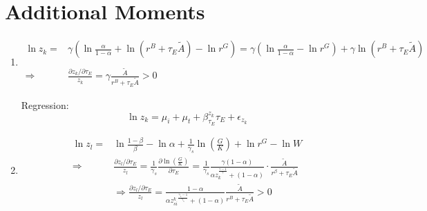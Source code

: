 \documentclass[12pt]{article} %
\begin{document}
\section*{Additional Moments}
\begin{enumerate}
    \item 
    \begin{equation*}
        \begin{split}
            \ln z_k =& {\gamma} (
            \ln \frac{\alpha}{1-\alpha} + \ln ({r^B + \tau_E\tilde{A}}) - \ln {r^G} ) =  {\gamma} (\ln \frac{\alpha}{1-\alpha} - \ln {r^G}) + {\gamma} \ln ({r^B + \tau_E\tilde{A}})\\
            \\
            \Rightarrow & \frac{\partial z_k/\partial \tau_E }{z_k} = {\gamma} \frac{\tilde{A}}{r^B + \tau_E\tilde{A}}>0
        \end{split}
    \end{equation*}

    Regression:
    \begin{equation*}
        \ln z_k = \mu_i + \mu_t + \beta_{\tau_E}^{z_k} \tau_E + \epsilon_{z_k}
    \end{equation*}



    \item 
    \begin{equation*}
        \begin{split}
            \ln z_l =& \ln \frac{1-\beta}{\beta} - \ln {\alpha} +\frac{1}{\gamma_s} \ln (\frac{G}{K}) + \ln r^G - \ln W\\
            \Rightarrow & \frac{\partial z_l/\partial \tau_E }{z_l} = \frac{1}{\gamma_s} \frac{\partial \ln (\frac{G}{K}) }{ \partial \tau_E}  =  \frac{1}{\gamma_s}\frac{\gamma(1-\alpha)}{\alpha z_k^{\frac{\gamma-1}{\gamma}}+(1-\alpha)} \cdot \frac{\tilde{A}}{r^\beta+\tau_E \tilde{A}} \\
            & 
            \Rightarrow \frac{\partial z_l/\partial \tau_E }{z_l} = \frac{1-\alpha}{{\alpha z^k_{si}}^{\frac{\gamma_s-1}{\gamma_s}} + (1-\alpha)}\frac{\tilde{A}}{r^B + \tau_E\tilde{A}} >0
        \end{split}
    \end{equation*}



\end{enumerate}
\end{document}
